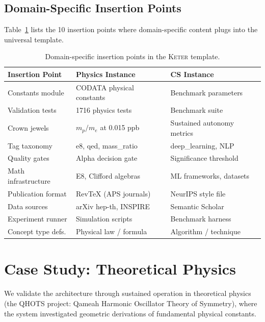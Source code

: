\documentclass[11pt,a4paper]{article}
\newcommand{\keter}{\textsc{Keter}}
\newcommand{\qhots}{\textsc{QHOTS}}
\begin{document}
\subsection{Domain-Specific Insertion Points}
\label{sec:insertion}

Table~\ref{tab:insertion} lists the 10 insertion points where domain-specific
content plugs into the universal template.

\begin{table}[t]
\centering
\caption{Domain-specific insertion points in the \keter{} template.}
\label{tab:insertion}
\small
\begin{tabular}{@{}lll@{}}
\toprule
Insertion Point & Physics Instance & CS Instance \\
\midrule
Constants module     & CODATA physical constants & Benchmark parameters \\
Validation tests     & 1716 physics tests        & Benchmark suite \\
Crown jewels         & $m_p/m_e$ at 0.015 ppb    & Sustained autonomy metrics \\
Tag taxonomy         & e8, qed, mass\_ratio       & deep\_learning, NLP \\
Quality gates        & Alpha decision gate        & Significance threshold \\
Math infrastructure  & E8, Clifford algebras      & ML frameworks, datasets \\
Publication format   & RevTeX (APS journals)      & NeurIPS style file \\
Data sources         & arXiv hep-th, INSPIRE      & Semantic Scholar \\
Experiment runner    & Simulation scripts         & Benchmark harness \\
Concept type defs.   & Physical law / formula     & Algorithm / technique \\
\bottomrule
\end{tabular}
\end{table}

\section{Case Study: Theoretical Physics}
\label{sec:instantiation}

We validate the architecture through sustained operation in theoretical physics
(the \qhots{} project: Qameah Harmonic Oscillator Theory of Symmetry), where
the system investigated geometric derivations of fundamental physical constants.
\end{document}

